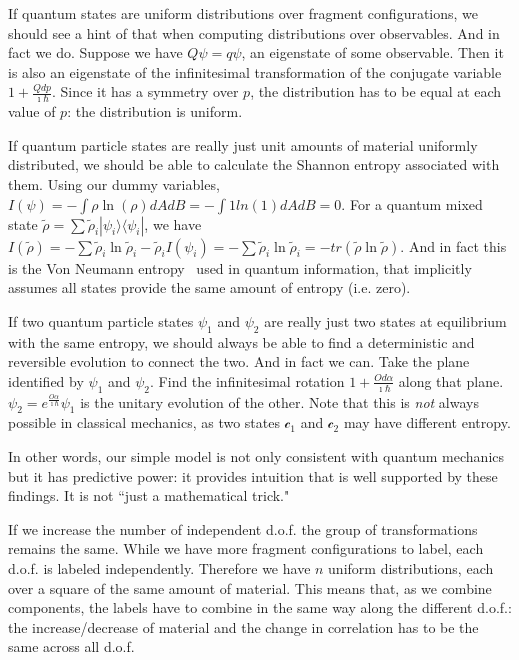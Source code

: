 \documentclass[smallextended]{svjour3}
\numberwithin{equation}{section}
\theoremstyle{definition}
\begin{document}
If quantum states are uniform distributions over fragment configurations, we should see a hint of that when computing distributions over observables. And in fact we do. Suppose we have $Q\psi = q \psi$, an eigenstate of some observable. Then it is also an eigenstate of the infinitesimal transformation of the conjugate variable $1+\frac{Qdp}{\imath\hbar}$. Since it has a symmetry over $p$, the distribution has to be equal at each value of $p$: the distribution is uniform.

If quantum particle states are really just unit amounts of material uniformly distributed, we should be able to calculate the Shannon entropy associated with them. Using our dummy variables, $I(\psi) = - \int \rho \ln (\rho) dA dB = - \int 1 ln (1) dA dB = 0$. For a quantum mixed state $\tilde{\rho} = \sum \tilde{\rho}_i |\psi_i\rangle \langle \psi_i |$, we have $I(\tilde{\rho}) = - \sum \tilde{\rho}_i \ln \tilde{\rho}_i - \tilde{\rho}_i I(\psi_i) = - \sum \tilde{\rho}_i \ln \tilde{\rho}_i = -tr(\tilde{\rho} \ln \tilde{\rho})$. And in fact this is the Von Neumann entropy~\cite{Von Neumann} used in quantum information, that implicitly assumes all states provide the same amount of entropy (i.e. zero).

If two quantum particle states $\psi_1$ and $\psi_2$ are really just two states at equilibrium with the same entropy, we should always be able to find a deterministic and reversible evolution to connect the two. And in fact we can. Take the plane identified by $\psi_1$ and $\psi_2$. Find the infinitesimal rotation $1 + \frac{Od\alpha}{\imath\hbar}$ along that plane. $\psi_2 = e^{\frac{O\alpha}{\imath\hbar}} \psi_1$ is the unitary evolution of the other. Note that this is \emph{not} always possible in classical mechanics, as two states $\mathcal{c}_1$ and $\mathcal{c}_2$ may have different entropy.

In other words, our simple model is not only consistent with quantum mechanics but it has predictive power: it provides intuition that is well supported by these findings. It is not ``just a mathematical trick."

If we increase the number of independent d.o.f. the group of transformations remains the same. While we have more fragment configurations to label, each d.o.f. is labeled independently. Therefore we have $n$ uniform distributions, each over a square of the same amount of material. This means that, as we combine components, the labels have to combine in the same way along the different d.o.f.: the increase/decrease of material and the change in correlation has to be the same across all d.o.f.
\end{document}
